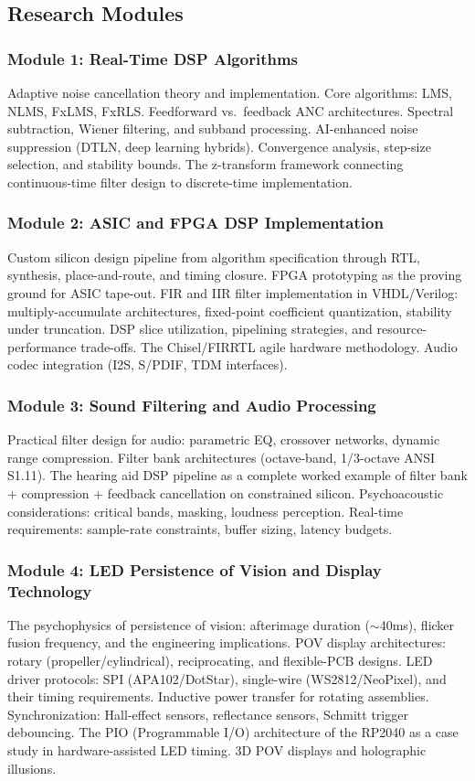 \documentclass[11pt,letterpaper]{article}
\begin{document}
\subsection{Research Modules}

\subsubsection{Module 1: Real-Time DSP Algorithms}
Adaptive noise cancellation theory and implementation. Core algorithms: LMS, NLMS, FxLMS, FxRLS. Feedforward vs.\ feedback ANC architectures. Spectral subtraction, Wiener filtering, and subband processing. AI-enhanced noise suppression (DTLN, deep learning hybrids). Convergence analysis, step-size selection, and stability bounds. The z-transform framework connecting continuous-time filter design to discrete-time implementation.

\subsubsection{Module 2: ASIC and FPGA DSP Implementation}
Custom silicon design pipeline from algorithm specification through RTL, synthesis, place-and-route, and timing closure. FPGA prototyping as the proving ground for ASIC tape-out. FIR and IIR filter implementation in VHDL/Verilog: multiply-accumulate architectures, fixed-point coefficient quantization, stability under truncation. DSP slice utilization, pipelining strategies, and resource-performance trade-offs. The Chisel/FIRRTL agile hardware methodology. Audio codec integration (I2S, S/PDIF, TDM interfaces).

\subsubsection{Module 3: Sound Filtering and Audio Processing}
Practical filter design for audio: parametric EQ, crossover networks, dynamic range compression. Filter bank architectures (octave-band, 1/3-octave ANSI S1.11). The hearing aid DSP pipeline as a complete worked example of filter bank + compression + feedback cancellation on constrained silicon. Psychoacoustic considerations: critical bands, masking, loudness perception. Real-time requirements: sample-rate constraints, buffer sizing, latency budgets.

\subsubsection{Module 4: LED Persistence of Vision and Display Technology}
The psychophysics of persistence of vision: afterimage duration ($\sim$40ms), flicker fusion frequency, and the engineering implications. POV display architectures: rotary (propeller/cylindrical), reciprocating, and flexible-PCB designs. LED driver protocols: SPI (APA102/DotStar), single-wire (WS2812/NeoPixel), and their timing requirements. Inductive power transfer for rotating assemblies. Synchronization: Hall-effect sensors, reflectance sensors, Schmitt trigger debouncing. The PIO (Programmable I/O) architecture of the RP2040 as a case study in hardware-assisted LED timing. 3D POV displays and holographic illusions.
\end{document}
